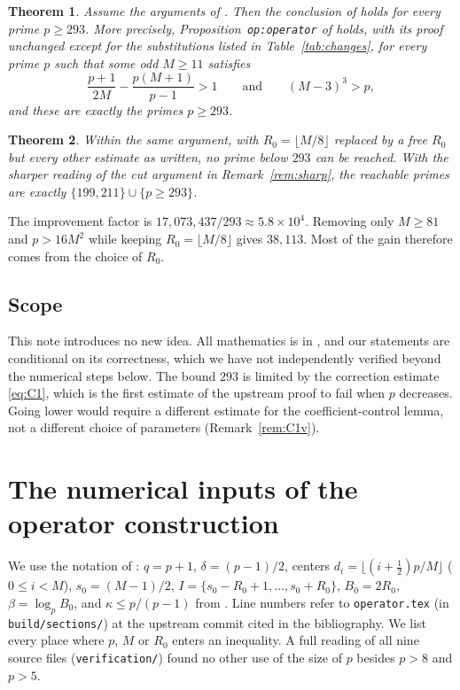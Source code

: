 \documentclass[11pt]{amsart}
\numberwithin{equation}{section}
\newtheorem{mainthm}{Theorem}
\theoremstyle{definition}
\theoremstyle{remark}
\newcommand{\up}[1]{\texttt{#1}}
\begin{document}
\begin{mainthm}\label{thm:A}
Assume the arguments of \cite{OAI-HW2}. Then the conclusion of
\cite[Theorem~1.1]{OAI-HW2} holds for every prime $p\ge293$.
More precisely, Proposition~\up{op:operator} of \cite{OAI-HW2} holds,
with its proof unchanged except for the substitutions listed in
Table~\ref{tab:changes}, for every prime $p$ such that some odd
$M\ge11$ satisfies
\begin{equation}\label{eq:criterion}
 \tag{$\ast$}
 \frac{p+1}{2M}-\frac{p(M+1)}{p-1}>1
 \qquad\text{and}\qquad (M-3)^3>p,
\end{equation}
and these are exactly the primes $p\ge293$.
\end{mainthm}

\begin{mainthm}\label{thm:B}
Within the same argument, with $R_0=\lfloor M/8\rfloor$ replaced by a
free $R_0$ but every other estimate as written, no prime below $293$
can be reached. With the sharper reading of the cut argument in
Remark~\ref{rem:sharp}, the reachable primes are exactly
$\{199,211\}\cup\{p\ge293\}$.
\end{mainthm}

The improvement factor is $17{,}073{,}437/293\approx5.8\times10^4$.
Removing only $M\ge81$ and $p>16M^2$ while keeping $R_0=\lfloor
M/8\rfloor$ gives $38{,}113$. Most of the gain therefore comes from the
choice of $R_0$.

\subsection*{Scope}
This note introduces no new idea. All mathematics is in
\cite{OAI-HW2}, and our statements are conditional on its correctness,
which we have not independently verified beyond the numerical steps
below. The bound $293$ is limited by the correction estimate
\eqref{eq:C1}, which is the first estimate of the upstream proof to
fail when $p$ decreases. Going lower would require a different
estimate for the coefficient-control lemma, not a different choice of
parameters (Remark~\ref{rem:C1v}).

\section{The numerical inputs of the operator construction}

We use the notation of \cite[\S\up{op}]{OAI-HW2}: $q=p+1$,
$\delta=(p-1)/2$, centers $d_i=\lfloor(i+\frac12)p/M\rfloor$
($0\le i<M$), $s_0=(M-1)/2$,
$I=\{s_0-R_0+1,\ldots,s_0+R_0\}$, $B_0=2R_0$, $\beta=\log_pB_0$, and
$\kappa\le p/(p-1)$ from \cite[(\up{op:kappa})]{OAI-HW2}. Line numbers
refer to \up{operator.tex} (in \up{build/sections/}) at the upstream commit cited
in the bibliography. We list every place where $p$, $M$ or $R_0$
enters an inequality. A full reading of all nine source files
(\up{verification/}) found no other use of the size of $p$ besides
$p>8$ and $p>5$.
\end{document}
